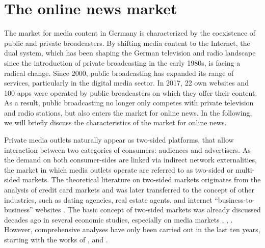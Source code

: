 \documentclass[12pt,a4paper,notitlepage]{article}
\begin{document}
\section{The online news market}\label{ch_onlinenews}

The market for media content in Germany is characterized by the coexistence of public and private broadcasters. By shifting media content to the Internet, the dual system, which has been shaping the German television and radio landscape since the introduction of private broadcasting in the early 1980s, is facing a radical change. Since 2000, public broadcasting has expanded its range of services, particularly in the digital media sector. In 2017, 22 own websites and 100 apps were operated by public broadcasters on which they offer their content. As a result, public broadcasting no longer only competes with private television and radio stations, but also enters the market for online news. In the following, we will briefly discuss the characteristics of the market for online news. 

Private media outlets naturally appear as two-sided platforms, that allow interaction between two categories of consumers: audiences and advertisers. As the demand on both consumer-sides are linked via indirect network externalities, the market in which media outlets operate are referred to as two-sided or multi-sided markets. The theoretical literature on two-sided markets originates from the analysis of credit card markets \citep{rochet_platform_2003} and was later transferred to the concept of other industries, such as dating agencies, real estate agents, and internet “business-to-business” websites \citep{caillaud_chicken_2003}. The basic concept of two-sided markets was already discussed decades ago in several economic studies, especially on media markets \citep{corden_maximisation_1952}, \citep{gustafsson_circulation_1978}, \citep{blair_pricing_1993}. However, comprehensive analyses have only been carried out in the last ten years, starting with the works of \citet{rochet_platform_2003}, \citet{evans_empirical_2003} and \citet{armstrong_competition_2006}.
\end{document}
